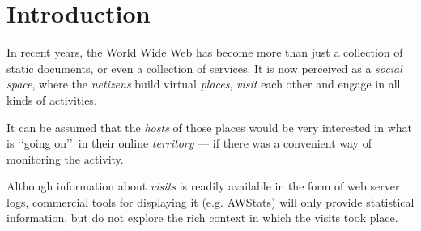 \documentclass[a4paper]{danarticle}
\theoremstyle{remark}
\begin{document}
\begin{abstract}
    Allerdings besch\"aftigten sich die bisherigen Arbeiten vor allen Dingen
    damit, die Existenz von sinnvollen Beziehungen zwischen Pl\"atzen
    nachzuweisen und diese zu identifizieren, und die Autoren machten keine
    Vorschl\"age zum Einsatzgebiet der vorgestellten Methoden.
    
    Dagegen macht das DoorStep System, welches wir in dieser Arbeit
    vorstellen, keinerlei Annahmen \"uber die Art der vorhandenen Relationen: Es
    ist so ausgelegt, da\"s es mit fast allen erdenklichen Relationen arbeiten
    kann. Diese Arbeit stellt eine Methode vor, mit der man vorhandene
    Relationen effizient verfolgen, sie in Beziehung zu Besuchern setzen und sie
    f\"ur eine einfache Pr\"asentation aufbereiten kann.
    
    Das Art dieser Pr\"asentation ist ebenfalls nicht festgelegt. Auch wenn wir
    in der vorliegenden Arbeit den Einsatz von \emph{Ambient Displays} (wie sie
    u.a. in \cite{ambient} verwendet wurden) vorschlagen, k\"onnen die
    Ergebnisse auf viele verschiedene Arten pr\"asentiert werden.
    
    In dieser Arbeit werden wir ein System vorstellen, da\"s nach Pl\"atzen
    sucht, die in Relation zu Besuchern (oder Besuchen) stehen, und
    pr\"asentieren die Ergebnisse die wir aus einer ersten Implementierung eines
    solchen Systems gewonnen haben. 
  \end{abstract}
  \newpage
  \section{Introduction}
    In recent years, the World Wide Web has become more than just a collection
    of static documents, or even a collection of services. It is now perceived
    as a \textit{social space}, where the \textit{netizens} build virtual
    \textit{places}, \textit{visit} each other and engage in all kinds of
    activities.
    
    It can be assumed that the \textit{hosts} of those places would be
    very interested in what is \lq\lq going on\rq\rq\ in their online
    \textit{territory} --- if
    there was a convenient way of monitoring the activity. 
    
    Although
    information about \textit{visits} is readily available in the
    form of web server logs, commercial tools for displaying it (e.g. 
    AWStats\cite{awstats}) will only
    provide statistical information, but do not explore the rich context in which
    the visits took place. 
    
\end{document}
